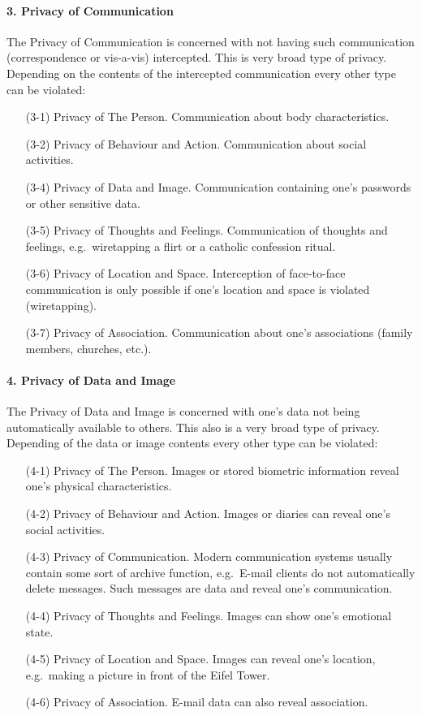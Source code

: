 \paragraph*{3. Privacy of Communication}

The Privacy of Communication is concerned with not having such communication (correspondence or vis-a-vis) intercepted.
This is very broad type of privacy.
Depending on the contents of the intercepted communication every other type can be violated:

\begin{itemize}
\item [(3-1)] Privacy of The Person. Communication about body characteristics.
\item [(3-2)] Privacy of Behaviour and Action. Communication about social activities.
\item [(3-4)] Privacy of Data and Image.
  Communication containing one's passwords or other sensitive data.
\item [(3-5)] Privacy of Thoughts and Feelings.
  Communication of thoughts and feelings, e.g.~wiretapping a flirt or a catholic confession
  ritual.
\item [(3-6)] Privacy of Location and Space.
  Interception of face-to-face communication is only possible if one's location and space is violated (wiretapping).
\item [(3-7)] Privacy of Association.
  Communication about one's associations (family members, churches, etc.).
\end{itemize}

\paragraph*{4. Privacy of Data and Image}

The Privacy of Data and Image is concerned with one's data not being automatically available to others.
This also is a very broad type of privacy.
Depending of the data or image contents every other type can be violated:

\begin{itemize}

\item [(4-1)] Privacy of The Person.
  Images or stored biometric information reveal one's physical characteristics.
\item [(4-2)]Privacy of Behaviour and Action.
  Images or diaries can reveal one's social activities.
\item [(4-3)]Privacy of Communication.
  Modern communication systems usually contain some sort of archive function, e.g.~E-mail clients do not automatically delete messages.
  Such messages are data and reveal one's communication.
\item [(4-4)]Privacy of Thoughts and Feelings.
  Images can show one's emotional state.
\item [(4-5)]Privacy of Location and Space.
  Images can reveal one's location, e.g.~making a picture in front of the Eifel Tower.
\item [(4-6)]Privacy of Association. E-mail data can also reveal
  association.
\end{itemize}

